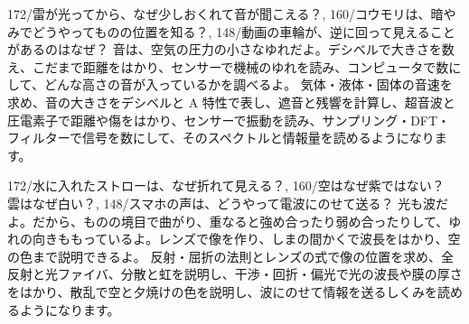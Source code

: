 \makeatletter{}\makeatother
{}%
  {172/{雷が光ってから、なぜ少しおくれて音が聞こえる？},
   160/{コウモリは、暗やみでどうやってものの位置を知る？},
   148/{動画の車輪が、逆に回って見えることがあるのはなぜ？}}%
  {音は、空気の圧力の小さなゆれだよ。デシベルで大きさを数え、こだまで距離をはかり、センサーで機械のゆれを読み、コンピュータで数にして、どんな高さの音が入っているかを調べるよ。}%
  {気体・液体・固体の音速を求め、音の大きさをデシベルと A 特性で表し、遮音と残響を計算し、超音波と圧電素子で距離や傷をはかり、センサーで振動を読み、サンプリング・DFT・フィルターで信号を数にして、そのスペクトルと情報量を読めるようになります。}

\makeatletter{}\makeatother%
%
  {172/{水に入れたストローは、なぜ折れて見える？},
   160/{空はなぜ紫ではない？　雲はなぜ白い？},
   148/{スマホの声は、どうやって電波にのせて送る？}}%
  {光も波だよ。だから、ものの境目で曲がり、重なると強め合ったり弱め合ったりして、ゆれの向きももっているよ。レンズで像を作り、しまの間かくで波長をはかり、空の色まで説明できるよ。}%
  {反射・屈折の法則とレンズの式で像の位置を求め、全反射と光ファイバ、分散と虹を説明し、干渉・回折・偏光で光の波長や膜の厚さをはかり、散乱で空と夕焼けの色を説明し、波にのせて情報を送るしくみを読めるようになります。}


